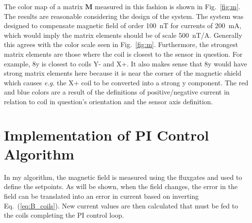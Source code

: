 
\FloatBarrier
The color map of a matrix $\bm{M}$ measured in this fashion is shown in Fig.~\ref{fig:m}.  The results are reasonable considering the design of the system.  The system was designed to compensate magnetic field of order 100~nT for currents of 200~mA, which would imply the matrix elements should be of scale 500~nT/A.  Generally this agrees with the color scale seen in Fig.~\ref{fig:m}.  Furthermore, the strongest matrix elements are those where the coil is closest to the sensor in question.  For example, 8y is closest to coils Y- and X+.  It also makes sense that 8y would have strong matrix elements here because it is near the corner of the magnetic shield which causes {\it e.g.} the X+ coil to be converted into a strong y component.  The red and blue colors are a result of the definitions of positive/negative current in relation to coil in question's orientation and the sensor axis definition.



\section{Implementation of PI Control Algorithm}\label{sec:pi}
 In my algorithm, the magnetic field is measured using the fluxgates and used to define the setpoints. As will be shown, when the field changes, the error in the field can be translated into an error in current based on inverting Eq.~(\ref{eq:B_coils}). New current values are then calculated that must be fed to the coils completing the PI control loop. 


